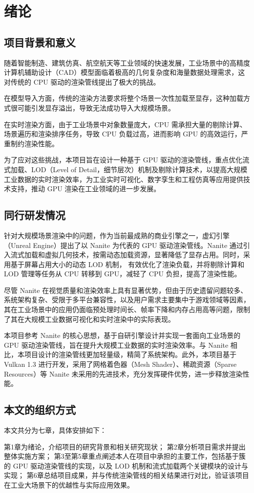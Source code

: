 \cleardoublepage

\section{绪论}

\subsection{项目背景和意义}
随着智能制造、建筑仿真、航空航天等工业领域的快速发展，工业场景中的高精度计算机辅助设计（CAD）模型面临着极高的几何复杂度和海量数据处理需求，这对传统的 CPU 驱动的渲染管线提出了极大的挑战。

在模型导入方面，传统的渲染方法要求将整个场景一次性加载至显存，这种加载方式很可能引发显存溢出，导致无法成功导入大规模场景。

在实时渲染方面，由于工业场景中对象数量庞大，CPU 需承担大量的剔除计算、场景遍历和渲染排序任务，导致 CPU 负载过高，进而影响 GPU 的高效运行，严重制约渲染性能。

为了应对这些挑战，本项目旨在设计一种基于 GPU 驱动的渲染管线，重点优化流式加载、LOD（Level of Detail，细节层次）机制及剔除计算技术，以提高大规模工业数据的实时渲染效率，为工业实时可视化、数字孪生和工程仿真等应用提供技术支持，推动 GPU 渲染在工业领域的进一步发展。

\subsection{同行研发情况}

针对大规模场景渲染中的问题，作为当前最成熟的商业引擎之一，虚幻引擎（Unreal Engine）提出了以 Nanite 为代表的 GPU 驱动渲染管线。Nanite 通过引入流式加载和虚拟几何技术，按需动态加载资源，显著降低了显存占用。同时，采用基于屏幕占用大小的动态 LOD 机制，
有效优化了渲染负载，并将剔除计算和 LOD 管理等任务从 CPU 转移到 GPU，减轻了 CPU 负担，提高了渲染性能。

尽管 Nanite 在视觉质量和渲染效率上具有显著优势，但由于历史遗留问题较多、系统架构复杂、受限于多平台兼容性，以及用户需求主要集中于游戏领域等因素，其在工业场景中的应用仍面临预处理时间长、帧率下降和内存占用高等问题，限制了其在大规模工业数据可视化和实时渲染中的实际表现。

本项目参考 Nanite 的核心思想，基于自研引擎设计并实现一套面向工业场景的 GPU 驱动渲染管线，旨在提升大规模工业数据的实时渲染效率。与 Nanite 相比，本项目设计的渲染管线更加轻量级，精简了系统架构。此外，本项目基于 Vulkan 1.3 进行开发，采用了网格着色器（Mesh Shader）、稀疏资源（Sparse Resources）等 Nanite 未采用的先进技术，充分发挥硬件优势，进一步释放渲染性能。

\subsection{本文的组织方式}

本文共分为七章，具体安排如下：

第1章为绪论，介绍项目的研究背景和相关研究现状；
第2章分析项目需求并提出整体实施方案；  
第3至第5章重点阐述本人在项目中承担的主要工作，包括基于簇的 GPU 驱动渲染管线的实现，以及 LOD 机制和流式加载两个关键模块的设计与实现；
第6章总结项目成果，并与传统渲染管线的相关结果进行对比，验证该项目在工业大场景下的优越性与实际应用效果。